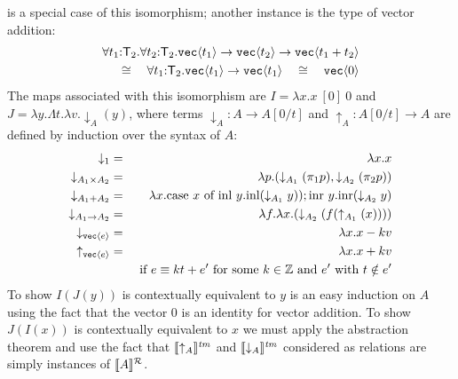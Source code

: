  is a special case of this isomorphism; another instance is the
type of vector addition:
\begin{eqnarray*}
\forall t_1\mathord:\mathsf{T}_2.\forall t_2\mathord:\mathsf{T}_2.\textup{\texttt{vec}}\langle t_1 \rangle\to\textup{\texttt{vec}}\langle t_2 \rangle\to\textup{\texttt{vec}}\langle t_1+t_2 \rangle\\
\cong\quad
\forall t_1\mathord:\mathsf{T}_2.\textup{\texttt{vec}}\langle t_1 \rangle\to\textup{\texttt{vec}}\langle t_1 \rangle\quad\cong\quad
\textup{\texttt{vec}}\langle 0 \rangle
\end{eqnarray*}
\noindent
\newcommand{\transup}[1]{\uparrow_{#1}}
\newcommand{\transdn}[1]{\downarrow_{#1}}
The maps associated with this isomorphism are 
$I = \lambda x. x\ [0]\ 0$ and $J = \lambda y. \Lambda t.\lambda v. \transdn A (y)$,
where terms $\transdn A : A\to A[0/t]$ and $\transup A : A[0/t] \to A$ are defined by induction over the syntax of $A$:
\begin{eqnarray*}
\transdn{1} & = & \lambda x. x\\ 
\transdn{A_1\times A_2} & = & \lambda p. (\transdn{A_1}(\pi_1 p),\transdn{A_2}(\pi_2 p))\\ 
\transdn{A_1 + A_2} & = & \lambda x.
\textrm{case}\ x\ \textrm{of}\ \textrm{inl}\ y.\textrm{inl}(\transdn{A_1}y)); \textrm{inr}\ y.\textrm{inr}(\transdn{A_2}y)\\ 
\transdn{A_1\to A_2} & = & \lambda f. \lambda x. (\transdn{A_2} (f(\transup{A_1}(x))))\\ 
\transdn{\tyPrim{vec}{e}} & = & \lambda x. x - kv\\ 
\transup{\tyPrim{vec}{e}} & = & \lambda x. x + kv\\ & & \text{ if }e \equiv k t + e'\text{ for
  some }k\in\setOfIntegers \text{ and }e'\text{ with }t\notin e'\\
\end{eqnarray*}
To show $I(J(y))$ is contextually equivalent to $y$ is an easy
induction on $A$ using the fact that the vector $0$
is an identity for vector addition. To show $J(I(x))$ is contextually
equivalent to $x$ we must apply the abstraction theorem and use
the fact that $\tmSem{\transup A}$ and $\tmSem{\transdn A}$ 
considered as relations are simply instances of $\llbracket A \rrbracket^{\mathcal{R}}_{}{}$.

